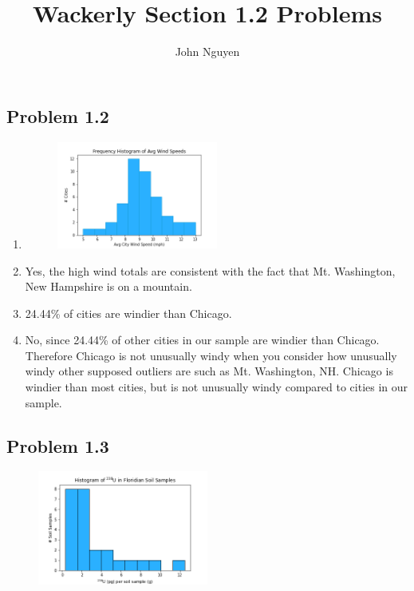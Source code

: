 \documentclass[12pt]{article}
\title{Wackerly Section 1.2 Problems}
\author{John Nguyen}
\begin{document}
\maketitle

\subsection*{Problem 1.2}
    \begin{enumerate}[label=(\alph*).]
        \item
        
        \begin{figure}[H]
        \centering
        \includegraphics[width=0.5\textwidth]{1_2_a.png}
        \end{figure}
        
        \item Yes, the high wind totals are consistent with the fact that Mt. Washington, New Hampshire is on a mountain.
        
        \item 24.44\% of cities are windier than Chicago.
        
        \item No, since 24.44\% of other cities in our sample are windier than Chicago. Therefore Chicago is not unusually windy when you consider how unusually windy other supposed outliers are such as Mt. Washington, NH. Chicago is windier than most cities, but is not unusually windy compared to cities in our sample.
        
    \end{enumerate}
        
\subsection*{Problem 1.3}
    \begin{figure}[H]
    \centering
    \includegraphics[width=0.5\textwidth]{1_3.png}
    \end{figure}
        
\end{document}
